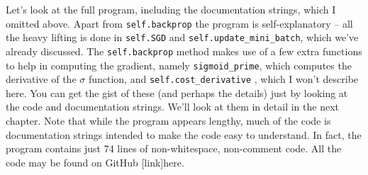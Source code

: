 \documentclass[a4paper,twoside,10pt]{book}
\begin{document}
Let's look at the full program, including the documentation strings, which I omitted above. Apart from \texttt{self.backprop} the program is self-explanatory -- all the heavy lifting is done in \texttt{self.SGD} and \texttt{self.update\_mini\_batch}, which we've already discussed. The \texttt{self.backprop} method makes use of a few extra functions to help in computing the gradient, namely \texttt{sigmoid\_prime}, which computes the derivative of the $\sigma$ function, and \texttt{self.cost\_derivative} , which I won't describe here. You can get the gist of these (and perhaps the details) just by looking at the code and documentation strings. We'll look at them in detail in the next chapter. Note that while the program appears lengthy, much of the code is documentation strings intended to make the code easy to understand. In fact, the program contains just 74 lines of non-whitespace, non-comment code. All the code may be found on GitHub [link]here.
\end{document}
